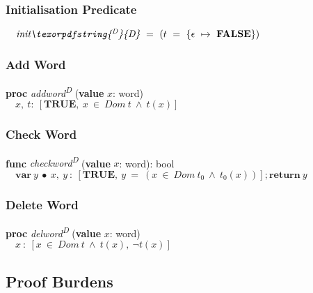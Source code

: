 \documentclass[a4paper, fleqn]{article}
\newcommand{\D}{\texorpdfstring{\textsuperscript{D}}{D}}
\begin{document}
\subsubsection{Initialisation Predicate}
								\label{sec:init}
\hspace*{20mm}$\quad\textit{init\D}\ =\ (t\ =\ \{\epsilon\ \mapsto\ \textbf{FALSE}\})$
\subsubsection{Add Word}
\hspace*{10mm}\textbf{proc} \textit{addword\D} (\textbf{value} $x$: word) \\
\hspace*{20mm}$\quad x,\ t:\ [\textbf{TRUE},\ x\ \in\ Dom\ t\ \land\ t(x)]$ 

\subsubsection{Check Word}
\hspace*{10mm}\textbf{func} \textit{checkword\D} (\textbf{value} $x$: word): bool \\
\hspace*{20mm}$\quad \textbf{var}\ y\ \bullet\ x,\ y\ :\ [\textbf{TRUE},\ y\ =\ (x\ \in\ Dom\ t_0\ \land\ t_0(x))]; \textbf{return}\ y$

\subsubsection{Delete Word}
\hspace*{10mm}\textbf{proc} \textit{delword\D} (\textbf{value} $x$: word) \\
\hspace*{20mm}$\quad x\ :\ [x\ \in\ Dom\ t\ \land\ t(x),\ \neg t(x)]$



\subsection{Proof Burdens}
\end{document}
